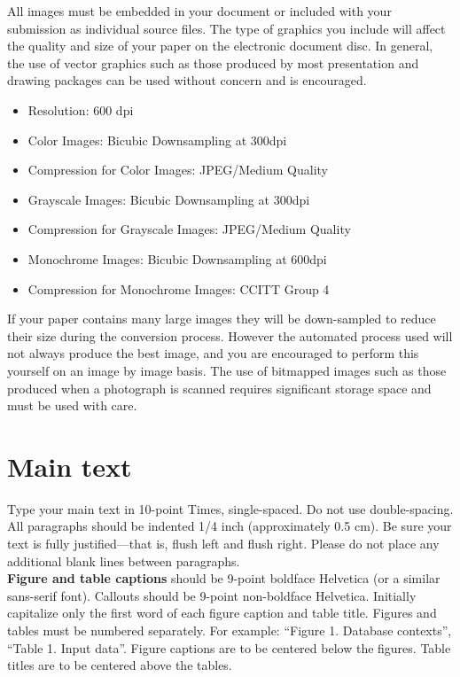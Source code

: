 \documentclass[10pt]{article}
\begin{document}
All images must be embedded in your document or included with your submission as individual source files. The type of graphics you include will affect the quality and size of your paper on the electronic document disc. In general, the use of vector graphics such as those produced by most presentation and drawing packages can be used without concern and is encouraged.

\begin{itemize}
\item Resolution: 600 dpi
\item Color Images: Bicubic Downsampling at 300dpi
\item Compression for Color Images: JPEG/Medium Quality
\item Grayscale Images: Bicubic Downsampling at 300dpi
\item Compression for Grayscale Images: JPEG/Medium Quality
\item Monochrome Images: Bicubic Downsampling at 600dpi
\item Compression for Monochrome Images: CCITT Group 4
\end{itemize}

If your paper contains many large images they will be down-sampled to reduce their size during the conversion process.  However the automated process used will not always produce the best image, and you are encouraged to perform this yourself on an image by image basis. The use of bitmapped images such as those produced when a photograph is scanned requires significant storage space and must be used with care.

\section{Main text}

Type your main text in 10-point Times, single-spaced. Do not use double-spacing. All paragraphs should be indented 1/4 inch (approximately 0.5 cm).  Be sure your text is fully justified—that is, flush left and flush right. Please do not place any additional blank lines between paragraphs. \\
\textbf{Figure and table captions} should be 9-point boldface Helvetica (or a similar sans-serif font).  Callouts should be 9-point non-boldface Helvetica. Initially capitalize only the first word of each figure caption and table title. Figures and tables must be numbered separately. For example: ``Figure 1. Database contexts'', ``Table 1. Input data''. Figure captions are to be centered below the figures. Table titles are to be centered above the tables.
\end{document}

